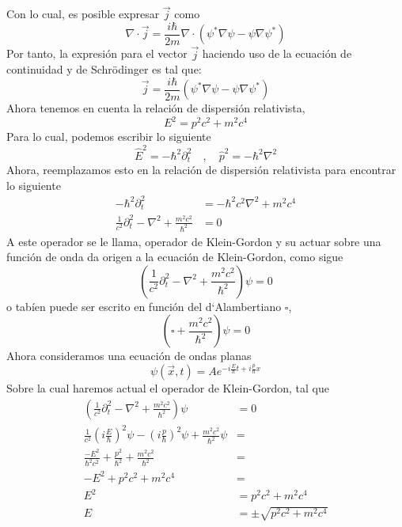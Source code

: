 \documentclass[../main_ej.tex]{subfiles}
\begin{document}
Con lo cual, es posible expresar $\vec{j}$ como 
\begin{equation*}
  \nabla \cdot \vec{j} = \frac{i\hbar}{2m} \nabla \cdot \left( \psi^*\nabla \psi - \psi \nabla \psi^* \right)
\end{equation*}
Por tanto, la expresión para el vector $\vec{j}$ haciendo uso de la ecuación de continuidad y de Schrödinger es tal que:
\begin{equation}
  \vec{j} = \frac{i\hbar}{2m}\left( \psi^*\nabla \psi - \psi\nabla \psi^* \right)
\end{equation}
Ahora tenemos en cuenta la relación de dispersión relativista, 
\begin{equation}
  E^2=p^2c^2+m^2c^4
\end{equation}
Para lo cual, podemos escribir lo siguiente
\begin{equation*}
  \hat{E}^2 = -\hbar^2\partial^2_t \quad , \quad \hat{p}^2 = -\hbar^2\nabla^2
\end{equation*}
Ahora, reemplazamos esto en la relación de dispersión relativista para encontrar lo siguiente
\begin{align*}
  -\hbar^2\partial^2_t & = -\hbar^2c^2\nabla^2 + m^2c^4 \\
  \frac{1}{c^2}\partial^2_t-\nabla^2 + \frac{m^2c^2}{\hbar^2} & = 0
\end{align*}
A este operador se le llama, operador de Klein-Gordon y su actuar sobre una función de onda da origen a la ecuación de Klein-Gordon, como sigue
\begin{equation}
  \left(\frac{1}{c^2}\partial^2_t-\nabla^2+\frac{m^2c^2}{\hbar^2}\right)\psi = 0
\end{equation}
o tabíen puede ser escrito en función del d`Alambertiano $\square$,
\begin{equation}
  \left(\square + \frac{m^2c^2}{\hbar^2}\right)\psi = 0
\end{equation}
Ahora consideramos una ecuación de ondas planas
\begin{equation*}
  \psi(\vec{x},t)=Ae^{-i\frac{E}{\hbar}t+i\frac{p}{\hbar}x}
\end{equation*}
Sobre la cual haremos actual el operador de Klein-Gordon, tal que
\begin{align*}
  \left(\frac{1}{c^2}\partial^2_t-\nabla^2+\frac{m^2c^2}{\hbar^2}\right)\psi  & = 0 \\
  \frac{1}{c^2}\left(i\frac{E}{\hbar}\right)^2\psi - \left(i\frac{p}{\hbar}\right)^2\psi + \frac{m^2c^2}{\hbar^2} \psi &  =  \\
  \frac{-E^2}{\hbar^2c^2} + \frac{p^2}{\hbar^2} + \frac{m^2c^2}{\hbar^2} & =  \\
  -E^2 + p^2c^2 + m^2c^4 & = \\
  E^2 & = p^2c^2 +  m^2c^4 \\
  E & = \pm \sqrt{p^2c^2 + m^2c^4}
\end{align*}
\end{document}
